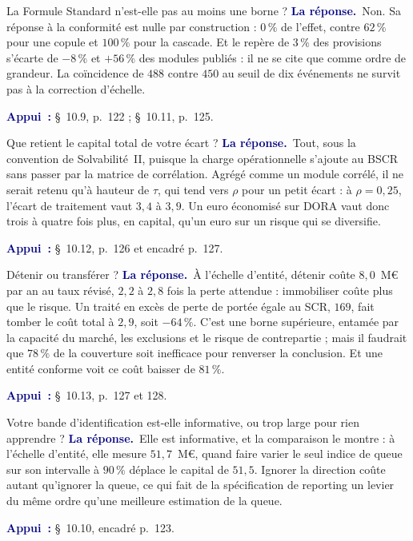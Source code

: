 \documentclass[11pt,a4paper]{article}
\newcommand{\rep}[1]{\smallskip\noindent\textcolor{navy}{\textbf{La réponse.}}\ #1\par}
\newcommand{\appui}[1]{\smallskip\noindent\small\textcolor{navy}{\textbf{Appui~:}} #1\par\normalsize}
\begin{document}
\begin{question}{\og La Formule Standard n'est-elle pas au moins une borne ?\fg{}}
\rep{Non. Sa réponse à la conformité est nulle par construction : $0\,\%$ de l'effet, contre
$62\,\%$ pour une copule et $100\,\%$ pour la cascade. Et le repère de $3\,\%$ des provisions
s'écarte de $-8\,\%$ et $+56\,\%$ des modules publiés : il ne se cite que comme ordre de grandeur. La
coïncidence de $488$ contre $450$ au seuil de dix événements ne survit pas à la correction
d'échelle.}
\appui{\S~10.9, p.~122 ; \S~10.11, p.~125.}
\end{question}

\begin{question}{\og Que retient le capital total de votre écart ?\fg{}}
\rep{Tout, sous la convention de Solvabilité~II, puisque la charge opérationnelle s'ajoute au BSCR
sans passer par la matrice de corrélation. Agrégé comme un module corrélé, il ne serait retenu qu'à
hauteur de $\tau$, qui tend vers $\rho$ pour un petit écart : à $\rho=0{,}25$, l'écart de
traitement vaut $3{,}4$ à $3{,}9$. Un euro économisé sur DORA vaut donc trois à quatre fois plus,
en capital, qu'un euro sur un risque qui se diversifie.}
\appui{\S~10.12, p.~126 et encadré p.~127.}
\end{question}

\begin{question}{\og Détenir ou transférer ?\fg{}}
\rep{À l'échelle d'entité, détenir coûte $8{,}0$~M\euro{} par an au taux révisé, $2{,}2$ à $2{,}8$
fois la perte attendue : immobiliser coûte plus que le risque. Un traité en excès de perte de portée
égale au SCR, $169$, fait tomber le coût total à $2{,}9$, soit $-64\,\%$. C'est une borne
supérieure, entamée par la capacité du marché, les exclusions et le risque de contrepartie ; mais il
faudrait que $78\,\%$ de la couverture soit inefficace pour renverser la conclusion. Et une entité
conforme voit ce coût baisser de $81\,\%$.}
\appui{\S~10.13, p.~127 et 128.}
\end{question}

\begin{question}{\og Votre bande d'identification est-elle informative, ou trop large pour rien apprendre ?\fg{}}
\rep{Elle est informative, et la comparaison le montre : à l'échelle d'entité, elle mesure
$51{,}7$~M\euro, quand faire varier le seul indice de queue sur son intervalle à $90\,\%$ déplace
le capital de $51{,}5$. Ignorer la direction coûte autant qu'ignorer la queue, ce qui fait de la
spécification de reporting un levier du même ordre qu'une meilleure estimation de la queue.}
\appui{\S~10.10, encadré p.~123.}
\end{question}
\end{document}

